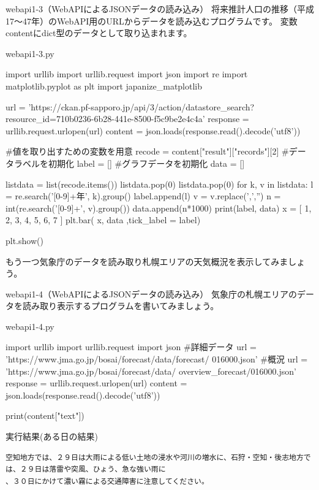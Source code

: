 \begin{pabox}{webapi1-3（WebAPIによるJSONデータの読み込み）}
将来推計人口の推移（平成17～47年）のWebAPI用のURLからデータを読み込むプログラムです。
変数contentにdict型のデータとして取り込まれます。
\begin{legbox}{webapi1-3.py}
\begin{listing}{1}
import urllib
import urllib.request
import json
import re
import matplotlib.pyplot as plt
import japanize_matplotlib

url = 'https://ckan.pf-sapporo.jp/api/3/action/datastore_search?
      resource_id=710b0236-6b28-441e-8500-f5c9be2e4c4a'
response = urllib.request.urlopen(url)
content = json.loads(response.read().decode('utf8'))

#値を取り出すための変数を用意
recode = content["result"]["records"][2]
#データラベルを初期化
label = []
#グラフデータを初期化
data = []

listdata = list(recode.items()) 
listdata.pop(0)
listdata.pop(0)
for k, v in listdata:
    l = re.search('[0-9]+年', k).group()
    label.append(l)
    v = v.replace(',','')
    n = int(re.search('[0-9]+', v).group())
    data.append(n*1000)
print(label, data)
x = [ 1, 2, 3, 4, 5, 6, 7 ]
plt.bar( x, data ,tick_label = label)

plt.show()
\end{listing}
\end{legbox}
\end{pabox}

もう一つ気象庁のデータを読み取り札幌エリアの天気概況を表示してみましょう。
\begin{pabox}{webapi1-4（WebAPIによるJSONデータの読み込み）}
気象庁の札幌エリアのデータを読み取り表示するプログラムを書いてみましょう。
\begin{legbox}{webapi1-4.py}
\begin{listing}{1}
import urllib
import urllib.request
import json
#詳細データ
url = 'https://www.jma.go.jp/bosai/forecast/data/forecast/
      016000.json'
#概況
url = 'https://www.jma.go.jp/bosai/forecast/data/
      overview_forecast/016000.json'
response = urllib.request.urlopen(url)
content = json.loads(response.read().decode('utf8'))

print(content["text"])

\end{listing}
実行結果(ある日の結果)
\begin{verbatim}
空知地方では、２９日は大雨による低い土地の浸水や河川の増水に、石狩・空知・後志地方では、２９日は落雷や突風、ひょう、急な強い雨に
、３０日にかけて濃い霧による交通障害に注意してください。
\end{verbatim}
\end{legbox}
\end{pabox}
